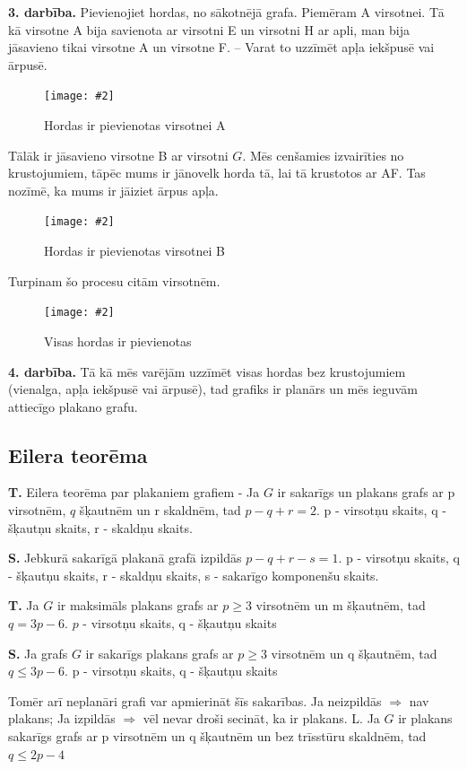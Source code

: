\documentclass{article}
\newcommand{\illustration}[3]{
	\begin{figure}[H]
		\centering	
		\texttt{[image: \#2]}
		\caption{#3}
	\end{figure}
}
\begin{document}
\textbf{3. darbība.} Pievienojiet hordas, no sākotnējā grafa.  Piemēram A virsotnei. Tā kā virsotne A bija savienota ar virsotni E un virsotni H ar apli, man bija jāsavieno tikai virsotne A un virsotne F. – Varat to uzzīmēt apļa iekšpusē vai ārpusē.


\illustration{0.5}{circle_chord_method-4}{Hordas ir pievienotas virsotnei A}

Tālāk ir jāsavieno virsotne B ar virsotni $ G $. Mēs cenšamies izvairīties no krustojumiem, tāpēc mums ir jānovelk horda tā, lai tā krustotos ar AF.  Tas nozīmē, ka mums ir jāiziet ārpus apļa.

\illustration{0.5}{circle_chord_method-6}{Hordas ir pievienotas virsotnei B}

Turpinam šo procesu citām virsotnēm.

\illustration{0.5}{circle_chord_method-7}{Visas hordas ir pievienotas}

\textbf{4. darbība.} Tā kā mēs varējām uzzīmēt visas hordas bez krustojumiem (vienalga, apļa iekšpusē vai ārpusē), tad grafiks ir planārs un mēs ieguvām attiecīgo plakano grafu.

\subsection{Eilera teorēma}

\textbf{T.} Eilera teorēma par plakaniem grafiem - Ja $ G $ ir sakarīgs un plakans grafs ar p virsotnēm, $q$ šķautnēm un r skaldnēm, tad $p − q + r = 2$.  p - virsotņu skaits, q - šķautņu skaits, r - skaldņu skaits.

\textbf{S. } Jebkurā sakarīgā plakanā grafā izpildās $p − q + r − s = 1$.  p - virsotņu skaits, q - šķautņu skaits, r - skaldņu skaits, s - sakarīgo komponenšu skaits.

\textbf{T.}  Ja $ G $ ir maksimāls plakans grafs ar $p \ge 3$ virsotnēm un m šķautnēm, tad $q = 3p − 6$.  $p$ - virsotņu skaits, q - šķautņu skaits

\textbf{S. } Ja grafs $ G $ ir sakarīgs plakans grafs ar $p \ge 3$ virsotnēm un q šķautnēm, tad $q \le 3p − 6$.  p - virsotņu skaits, q - šķautņu skaits

Tomēr arī neplanāri grafi var apmierināt šīs sakarības.  Ja neizpildās $\Rightarrow$ nav plakans; Ja izpildās $\Rightarrow$ vēl nevar droši secināt, ka ir plakans. L.  Ja $ G $ ir plakans sakarīgs grafs ar p virsotnēm un q šķautnēm un bez trīsstūru skaldnēm, tad $q \le 2p − 4$
\end{document}
